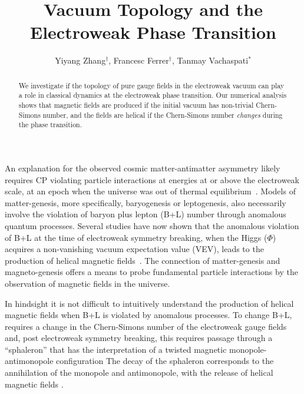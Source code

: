 \documentclass[prd,twocolumn,nofootinbib]{revtex4-1}
\begin{document}
\title{Vacuum Topology and the Electroweak Phase Transition}
\author{Yiyang Zhang$^\dag$, Francesc Ferrer$^\dag$, Tanmay Vachaspati$^*$}


\begin{abstract}
\noindent
We investigate if the topology of pure gauge fields in the electroweak vacuum can play a role in
classical dynamics at the electroweak phase transition. 
Our numerical analysis shows that magnetic fields are produced if the initial vacuum has non-trivial 
Chern-Simons number, and the fields are helical if the Chern-Simons number {\it changes} during the 
phase transition.
\end{abstract}

\maketitle

An explanation for the observed cosmic matter-antimatter asymmetry likely requires
CP violating particle interactions at energies at or above the electroweak scale,
at an epoch when the universe was out of thermal equilibrium~\cite{sakharov1967violation}. 
Models of matter-genesis, more specifically, baryogenesis or leptogenesis, also necessarily involve the 
violation of baryon plus lepton (B+L) number through anomalous quantum processes. Several studies 
have now shown that the anomalous violation of B+L at the time of 
electroweak symmetry breaking, when the Higgs ($\Phi$) acquires a non-vanishing vacuum expectation 
value (VEV), leads to the production of helical magnetic 
fields~\cite{cornwall1997speculations,vachaspati2001estimate}. 
 The connection of matter-genesis and magneto-genesis offers a means to probe fundamental particle 
 interactions by the observation of magnetic fields in the universe.

In hindsight it is not difficult to intuitively understand the production of helical 
magnetic fields when B+L is violated by anomalous processes. To change B+L, requires 
a change in the Chern-Simons number of the electroweak gauge fields and,
post electroweak symmetry breaking, this requires passage through a ``sphaleron''
\cite{Manton:1983nd}
that has the interpretation of a twisted magnetic monopole-antimonopole configuration \cite{vachaspati1994electroweak,hindmarsh1994origin,Saurabh:2017ryg}
The decay of the sphaleron corresponds to the annihilation of the monopole and antimonopole, with
the release of helical magnetic fields \cite{copi2008helical,chu2011magnetic}.
\end{document}
